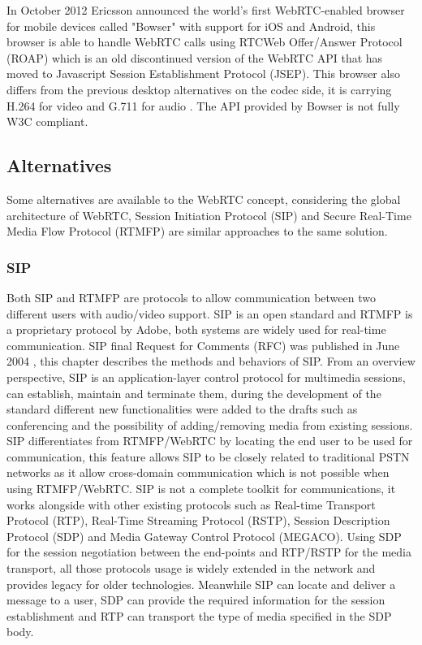 In October 2012 Ericsson announced the world's first WebRTC-enabled browser for mobile devices called "Bowser" with support for iOS and Android, this browser is able to handle WebRTC calls using RTCWeb Offer/Answer Protocol (ROAP) which is an old discontinued version of the WebRTC API that has moved to Javascript Session Establishment Protocol (JSEP). This browser also differs from the previous desktop alternatives on the codec side, it is carrying H.264 for video and G.711 for audio \cite{ericssonbowser}. The API provided by Bowser is not fully W3C compliant.

\subsection{Alternatives}

Some alternatives are available to the WebRTC concept, considering the global architecture of WebRTC, Session Initiation Protocol (SIP) and Secure Real-Time Media Flow Protocol (RTMFP) are similar approaches to the same solution.

\subsubsection{SIP}

Both SIP and RTMFP are protocols to allow communication between two different users with audio/video support. SIP is an open standard and RTMFP is a proprietary protocol by Adobe, both systems are widely used for real-time communication. SIP final Request for Comments (RFC) was published in June 2004 \cite{sipRFC}, this chapter describes the methods and behaviors of SIP. From an overview perspective, SIP is an application-layer control protocol for multimedia sessions, can establish, maintain and terminate them, during the development of the standard different new functionalities were added to the drafts such as conferencing and the possibility of adding/removing media from existing sessions. SIP differentiates from RTMFP/WebRTC by locating the end user to be used for communication, this feature allows SIP to be closely related to traditional PSTN networks as it allow cross-domain communication which is not possible when using RTMFP/WebRTC. SIP is not a complete toolkit for communications, it works alongside with other existing protocols such as Real-time Transport Protocol (RTP), Real-Time Streaming Protocol (RSTP), Session Description Protocol (SDP) and Media Gateway Control Protocol (MEGACO). Using SDP for the session negotiation between the end-points and RTP/RSTP for the media transport, all those protocols usage is widely extended in the network and provides legacy for older technologies. Meanwhile SIP can locate and deliver a message to a user, SDP can provide the required information for the session establishment and RTP can transport the type of media specified in the SDP body.

